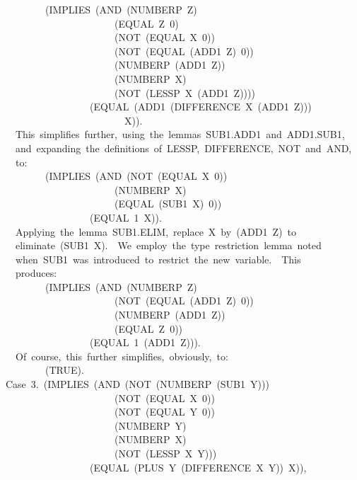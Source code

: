 \documentclass[11pt]{book}
\newenvironment{pubasis}{\begin{flushleft}\ttfamily\small}{\normalsize\rmfamily\end{flushleft}}
\begin{document}
\begin{pubasis}
~~~~~~~~~~(IMPLIES~(AND~(NUMBERP~Z)\\
~~~~~~~~~~~~~~~~~~~~~~~~(EQUAL~Z~0)\\
~~~~~~~~~~~~~~~~~~~~~~~~(NOT~(EQUAL~X~0))\\
~~~~~~~~~~~~~~~~~~~~~~~~(NOT~(EQUAL~(ADD1~Z)~0))\\
~~~~~~~~~~~~~~~~~~~~~~~~(NUMBERP~(ADD1~Z))\\
~~~~~~~~~~~~~~~~~~~~~~~~(NUMBERP~X)\\
~~~~~~~~~~~~~~~~~~~~~~~~(NOT~(LESSP~X~(ADD1~Z))))\\
~~~~~~~~~~~~~~~~~~~(EQUAL~(ADD1~(DIFFERENCE~X~(ADD1~Z)))\\
~~~~~~~~~~~~~~~~~~~~~~~~~~X)).\\

~~~~This~simplifies~further,~using~the~lemmas~SUB1.ADD1~and~ADD1.SUB1,\\
~~~~and~expanding~the~definitions~of~LESSP,~DIFFERENCE,~NOT~and~AND,\\
~~~~to:\\

~~~~~~~~~~(IMPLIES~(AND~(NOT~(EQUAL~X~0))\\
~~~~~~~~~~~~~~~~~~~~~~~~(NUMBERP~X)\\
~~~~~~~~~~~~~~~~~~~~~~~~(EQUAL~(SUB1~X)~0))\\
~~~~~~~~~~~~~~~~~~~(EQUAL~1~X)).\\

~~~~Applying~the~lemma~SUB1.ELIM,~replace~X~by~(ADD1~Z)~to\\
~~~~eliminate~(SUB1~X).~~We~employ~the~type~restriction~lemma~noted\\
~~~~when~SUB1~was~introduced~to~restrict~the~new~variable.~~This\\
~~~~produces:\\

~~~~~~~~~~(IMPLIES~(AND~(NUMBERP~Z)\\
~~~~~~~~~~~~~~~~~~~~~~~~(NOT~(EQUAL~(ADD1~Z)~0))\\
~~~~~~~~~~~~~~~~~~~~~~~~(NUMBERP~(ADD1~Z))\\
~~~~~~~~~~~~~~~~~~~~~~~~(EQUAL~Z~0))\\
~~~~~~~~~~~~~~~~~~~(EQUAL~1~(ADD1~Z))).\\

~~~~Of~course,~this~further~simplifies,~obviously,~to:\\

~~~~~~~~~~(TRUE).\\

~~Case~3.~(IMPLIES~(AND~(NOT~(NUMBERP~(SUB1~Y)))\\
~~~~~~~~~~~~~~~~~~~~~~~~(NOT~(EQUAL~X~0))\\
~~~~~~~~~~~~~~~~~~~~~~~~(NOT~(EQUAL~Y~0))\\
~~~~~~~~~~~~~~~~~~~~~~~~(NUMBERP~Y)\\
~~~~~~~~~~~~~~~~~~~~~~~~(NUMBERP~X)\\
~~~~~~~~~~~~~~~~~~~~~~~~(NOT~(LESSP~X~Y)))\\
~~~~~~~~~~~~~~~~~~~(EQUAL~(PLUS~Y~(DIFFERENCE~X~Y))~X)),\\


\end{pubasis}
\end{document}
